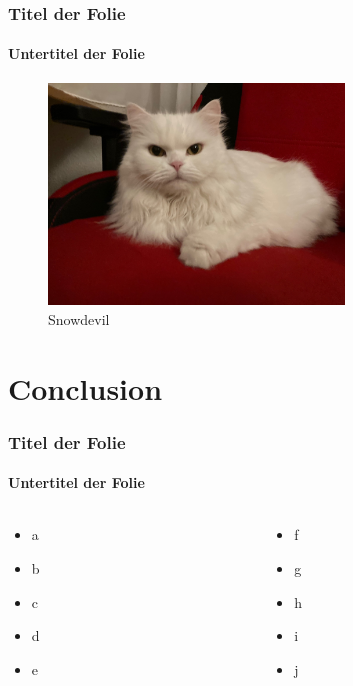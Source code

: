 \documentclass{beamer}
\begin{document}
\begin{frame}
\frametitle{Titel der Folie}
\framesubtitle{Untertitel der Folie}

\begin{figure}
\begin{center}
\includegraphics[width=0.7\textwidth]{./IncludedPictures/Cat}
\caption{Snowdevil}
\end{center}
\end{figure}

\end{frame}

\section{Conclusion}

\begin{frame}
\frametitle{Titel der Folie}
\framesubtitle{Untertitel der Folie}

\begin{columns}
\begin{column}{0.495\textwidth}
\begin{itemize}
\item a
\item b
\item c
\item d
\item e
\end{itemize}
\end{column}
\begin{column}{0.495\textwidth}
\begin{itemize}
\item f
\item g
\item h
\item i
\item j
\end{itemize}
\end{column}
\end{columns}

\end{frame}
\end{document}
